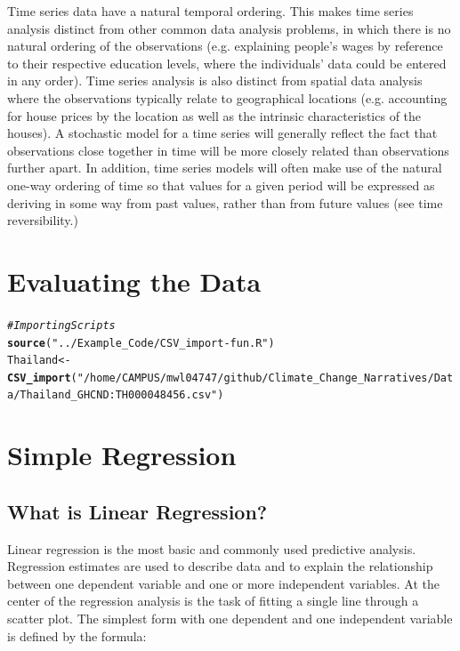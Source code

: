 \documentclass{article}\usepackage[]{graphicx}\usepackage[]{color}
\makeatletter
\newcommand{\hlstr}[1]{\textcolor[rgb]{0.192,0.494,0.8}{#1}}%
\newcommand{\hlcom}[1]{\textcolor[rgb]{0.678,0.584,0.686}{\textit{#1}}}%
\newcommand{\hlstd}[1]{\textcolor[rgb]{0.345,0.345,0.345}{#1}}%
\newcommand{\hlkwb}[1]{\textcolor[rgb]{0.69,0.353,0.396}{#1}}%
\newcommand{\hlkwd}[1]{\textcolor[rgb]{0.737,0.353,0.396}{\textbf{#1}}}%
\newenvironment{kframe}{%
 \def\at@end@of@kframe{}%
 \ifinner\ifhmode%
  \def\at@end@of@kframe{\end{minipage}}%
  \begin{minipage}{\columnwidth}%
 \fi\fi%
 \def\FrameCommand##1{\hskip\@totalleftmargin \hskip-\fboxsep
 \colorbox{shadecolor}{##1}\hskip-\fboxsep
     \hskip-\linewidth \hskip-\@totalleftmargin \hskip\columnwidth}%
 \MakeFramed {\advance\hsize-\width
   \@totalleftmargin\z@ \linewidth\hsize
   \@setminipage}}%
 {\par\unskip\endMakeFramed%
 \at@end@of@kframe}
\newenvironment{knitrout}{}{} %
\makeatother
\begin{document}
Time series data have a natural temporal ordering. This makes time series analysis distinct from other common data analysis problems, in which there is no natural ordering of the observations (e.g. explaining people's wages by reference to their respective education levels, where the individuals' data could be entered in any order). Time series analysis is also distinct from spatial data analysis where the observations typically relate to geographical locations (e.g. accounting for house prices by the location as well as the intrinsic characteristics of the houses). A stochastic model for a time series will generally reflect the fact that observations close together in time will be more closely related than observations further apart. In addition, time series models will often make use of the natural one-way ordering of time so that values for a given period will be expressed as deriving in some way from past values, rather than from future values (see time reversibility.)

\section{Evaluating the Data}

\begin{knitrout}
\color{fgcolor}\begin{kframe}
\begin{alltt}
\hlcom{# Importing Scripts}
\hlkwd{source}\hlstd{(}\hlstr{"../Example_Code/CSV_import-fun.R"}\hlstd{)}
\hlstd{Thailand} \hlkwb{<-} \hlkwd{CSV_import}\hlstd{(}\hlstr{"/home/CAMPUS/mwl04747/github/Climate_Change_Narratives/Data/Thailand_GHCND:TH000048456.csv"}\hlstd{)}
\end{alltt}
\end{kframe}
\end{knitrout}

\section{Simple Regression}

\subsection{What is Linear Regression?}

Linear regression is the most basic and commonly used predictive analysis.  Regression estimates are used to describe data and to explain the relationship between one dependent variable and one or more independent variables.  At the center of the regression analysis is the task of fitting a single line through a scatter plot.  The simplest form with one dependent and one independent variable is defined by the formula:
\end{document}
